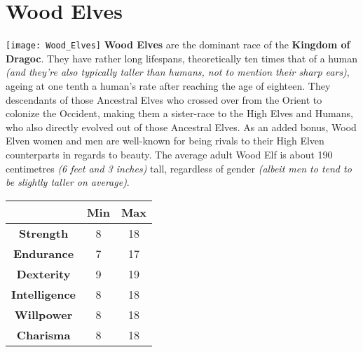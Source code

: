 \documentclass[openany,10pt,a4paper]{book}
\begin{document}
\section{Wood Elves}
\texttt{[image: Wood\_Elves]}\newline
\textbf{Wood Elves} are the dominant race of the \textbf{Kingdom of Dragoc}. They have rather long lifespans, theoretically ten times that of a human \textit{(and they're also typically taller than humans, not to mention their sharp ears)}, ageing at one tenth a human's rate after reaching the age of eighteen. They descendants of those Ancestral Elves who crossed over from the Orient to colonize the Occident, making them a sister-race to the High Elves and Humans, who also directly evolved out of those Ancestral Elves. As an added bonus, Wood Elven women and men are well-known for being rivals to their High Elven counterparts in regards to beauty. The average adult Wood Elf is about 190 centimetres \textit{(6 feet and 3 inches)} tall, regardless of gender \textit{(albeit men to tend to be slightly taller on average)}.\newline
\begin{tabular}{|c|c|c|}
\hline
 & \textbf{Min} & \textbf{Max} \\ \hline
\textbf{Strength} & 8 & 18 \\ \hline
\textbf{Endurance} & 7 & 17 \\ \hline
\textbf{Dexterity} & 9 & 19 \\ \hline
\textbf{Intelligence} & 8 & 18 \\ \hline
\textbf{Willpower} & 8 & 18 \\ \hline
\textbf{Charisma} & 8 & 18 \\ \hline
\end{tabular}\newline
{} \newpage
\end{document}
